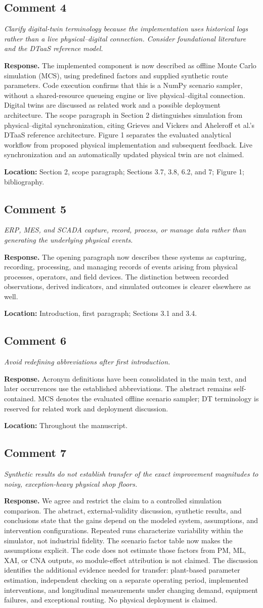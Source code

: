 \documentclass[11pt,a4paper]{article}
\newcommand{\commentitem}[2]{\Needspace{9\baselineskip}\subsection*{Comment #1}\textit{#2}\par\textbf{Response.} }
\begin{document}
\commentitem{4}{Clarify digital-twin terminology because the implementation uses historical logs rather than a live physical--digital connection. Consider foundational literature and the DTaaS reference model.}
The implemented component is now described as offline Monte Carlo simulation (MCS), using predefined factors and supplied synthetic route parameters. Code execution confirms that this is a NumPy scenario sampler, without a shared-resource queueing engine or live physical--digital connection. Digital twins are discussed as related work and a possible deployment architecture. The scope paragraph in Section 2 distinguishes simulation from physical--digital synchronization, citing Grieves and Vickers and Aheleroff et al.'s DTaaS reference architecture. Figure 1 separates the evaluated analytical workflow from proposed physical implementation and subsequent feedback. Live synchronization and an automatically updated physical twin are not claimed.

\textbf{Location:} Section 2, scope paragraph; Sections 3.7, 3.8, 6.2, and 7; Figure 1; bibliography.

\commentitem{5}{ERP, MES, and SCADA capture, record, process, or manage data rather than generating the underlying physical events.}
The opening paragraph now describes these systems as capturing, recording, processing, and managing records of events arising from physical processes, operators, and field devices. The distinction between recorded observations, derived indicators, and simulated outcomes is clearer elsewhere as well.

\textbf{Location:} Introduction, first paragraph; Sections 3.1 and 3.4.

\commentitem{6}{Avoid redefining abbreviations after first introduction.}
Acronym definitions have been consolidated in the main text, and later occurrences use the established abbreviations. The abstract remains self-contained. MCS denotes the evaluated offline scenario sampler; DT terminology is reserved for related work and deployment discussion.

\textbf{Location:} Throughout the manuscript.

\commentitem{7}{Synthetic results do not establish transfer of the exact improvement magnitudes to noisy, exception-heavy physical shop floors.}
We agree and restrict the claim to a controlled simulation comparison. The abstract, external-validity discussion, synthetic results, and conclusions state that the gains depend on the modeled system, assumptions, and intervention configurations. Repeated runs characterize variability within the simulator, not industrial fidelity. The scenario factor table now makes the assumptions explicit. The code does not estimate those factors from PM, ML, XAI, or CNA outputs, so module-effect attribution is not claimed. The discussion identifies the additional evidence needed for transfer: plant-based parameter estimation, independent checking on a separate operating period, implemented interventions, and longitudinal measurements under changing demand, equipment failures, and exceptional routing. No physical deployment is claimed.
\end{document}
